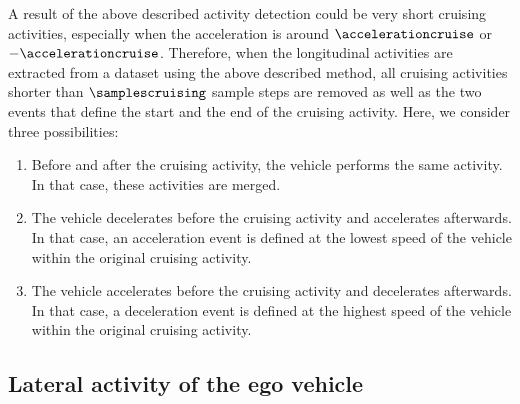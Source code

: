A result of the above described activity detection could be very short cruising activities, especially when the acceleration is around $\accelerationcruise$ or $-\accelerationcruise$. Therefore, when the longitudinal activities are extracted from a dataset using the above described method, all cruising activities shorter than $\samplescruising$ sample steps are removed as well as the two events that define the start and the end of the cruising activity. Here, we consider three possibilities:
\begin{enumerate}
	\item Before and after the cruising activity, the vehicle performs the same activity. In that case, these activities are merged.
	\item The vehicle decelerates before the cruising activity and accelerates afterwards. In that case, an acceleration event is defined at the lowest speed of the vehicle within the original cruising activity.
	\item The vehicle accelerates before the cruising activity and decelerates afterwards. In that case, a deceleration event is defined at the highest speed of the vehicle within the original cruising activity.
\end{enumerate}



\subsection{Lateral activity of the ego vehicle}
\label{sec:lateral ego}

